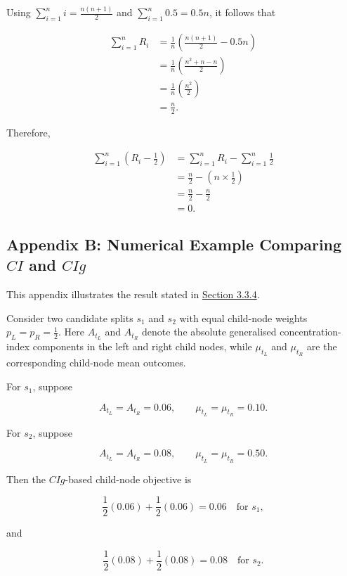 \documentclass[
  11pt,
  a4paper,
]{article}
\begin{document}
Using \(\sum_{i=1}^n i = \frac{n(n+1)}{2}\) and
\(\sum_{i=1}^n 0.5 = 0.5n\), it follows that

\[
\begin{aligned}
\sum_{i=1}^n R_i &= \frac{1}{n} \left( \frac{n(n+1)}{2} - 0.5n \right) \\
&= \frac{1}{n} \left( \frac{n^2 + n - n}{2} \right) \\
&= \frac{1}{n} \left( \frac{n^2}{2} \right) \\
&= \frac{n}{2}.
\end{aligned}
\]

Therefore,

\[
\begin{aligned}
\sum_{i=1}^n \left( R_i - \frac{1}{2} \right) &= \sum_{i=1}^n R_i - \sum_{i=1}^n \frac{1}{2} \\
&= \frac{n}{2} - \left(n \times \frac{1}{2}\right) \\
&= \frac{n}{2} - \frac{n}{2} \\
&= 0.
\end{aligned}
\]

\subsection{\texorpdfstring{Appendix B: Numerical Example Comparing
\(CI\) and
\(CIg\)}{Appendix B: Numerical Example Comparing CI and CIg}}\label{app-ci-cig-example}

This appendix illustrates the result stated in
\hyperref[sec-split-behaviour-impurity]{Section 3.3.4}.

Consider two candidate splits \(s_1\) and \(s_2\) with equal child-node
weights \(p_L = p_R = \tfrac12\). Here \(A_{t_L}\) and \(A_{t_R}\)
denote the absolute generalised concentration-index components in the
left and right child nodes, while \(\mu_{t_L}\) and \(\mu_{t_R}\) are
the corresponding child-node mean outcomes.

For \(s_1\), suppose

\[
A_{t_L}=A_{t_R}=0.06,
\qquad
\mu_{t_L}=\mu_{t_R}=0.10.
\]

For \(s_2\), suppose

\[
A_{t_L}=A_{t_R}=0.08,
\qquad
\mu_{t_L}=\mu_{t_R}=0.50.
\]

Then the \(CIg\)-based child-node objective is

\[
\frac12(0.06)+\frac12(0.06)=0.06
\quad \text{for } s_1,
\]

and

\[
\frac12(0.08)+\frac12(0.08)=0.08
\quad \text{for } s_2.
\]
\end{document}
